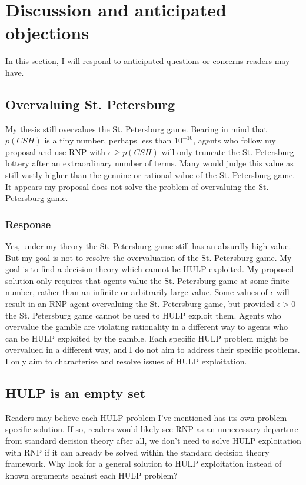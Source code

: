 \documentclass{article}
\begin{document}
\newpage\section{Discussion and anticipated objections}

In this section, I will respond to anticipated questions or concerns readers may have. 

\subsection{Overvaluing St. Petersburg} 

My thesis still overvalues the St. Petersburg game. Bearing in mind that \(p(CSH)\) is a tiny number, perhaps less than \(10^{-10}\), agents who follow my proposal and use RNP with \(\epsilon \geq p(CSH)\) will only truncate the St. Petersburg lottery after an extraordinary number of terms. Many would judge this value as still vastly higher than the genuine or rational value of the St. Petersburg game. It appears my proposal does not solve the problem of overvaluing the St. Petersburg game. 

\subsubsection*{Response}

Yes, under my theory the St. Petersburg game still has an absurdly high value. But my goal is not to resolve the overvaluation of the St. Petersburg game. My goal is to find a decision theory which cannot be HULP exploited. My proposed solution only requires that agents value the St. Petersburg game at some finite number, rather than an infinite or arbitrarily large value. Some values of \(\epsilon\) will result in an RNP-agent overvaluing the St. Petersburg game, but provided \(\epsilon>0\) the St. Petersburg game cannot be used to HULP exploit them. Agents who overvalue the gamble are violating rationality in a different way to agents who can be HULP exploited by the gamble. Each specific HULP problem might be overvalued in a different way, and I do not aim to address their specific problems. I only aim to characterise and resolve issues of HULP exploitation.

\subsection{HULP is an empty set} 

Readers may believe each HULP problem I've mentioned has its own problem-specific solution. If so, readers would likely see RNP as an unnecessary departure from standard decision theory \textemdash{} after all, we don't need to solve HULP exploitation with RNP if it can already be solved within the standard decision theory framework. Why look for a general solution to HULP exploitation instead of known arguments against each HULP problem?
\end{document}

